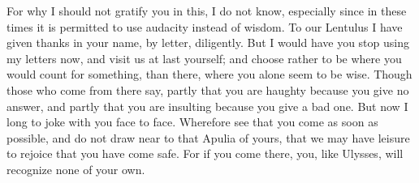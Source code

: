 

 For why I should not gratify you in this, I do not know, especially since in these times it is permitted to use audacity instead of wisdom. To our Lentulus I have given thanks in your name, by letter, diligently. But I would have you stop using my letters now, and visit us at last yourself; and choose rather to be where you would count for something, than there, where you alone seem to be wise. Though those who come from there say, partly that you are haughty because you give no answer, and partly that you are insulting because you give a bad one. But now I long to joke with you face to face. Wherefore see that you come as soon as possible, and do not draw near to that Apulia of yours, that we may have leisure to rejoice that you have come safe. For if you come there, you, like Ulysses, will recognize none of your own.
